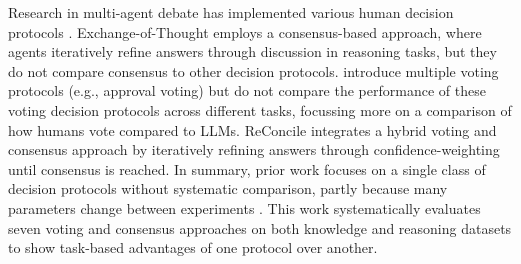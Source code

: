 Research in multi-agent debate has implemented various human decision protocols \citep{yin_exchange--thought_2023, chen_reconcile_2024, yang_llm_2024}. 
Exchange-of-Thought \citep{yin_exchange--thought_2023} employs a consensus-based approach, where agents iteratively refine answers through discussion in reasoning tasks, but they do not compare consensus to other decision protocols.
\citet{yang_llm_2024, 10.1145/3665332} introduce multiple voting protocols (e.g., approval voting) but do not compare the performance of these voting decision protocols across different tasks, focussing more on a comparison of how humans vote compared to \acp{LLM}.
ReConcile \citep{chen_reconcile_2024} integrates a hybrid voting and consensus approach by iteratively refining answers through confidence-weighting until consensus is reached. %
In summary, prior work focuses on a single class of decision protocols without systematic comparison, partly because many parameters change between experiments \citep{yin_exchange--thought_2023, yang_llm_2024, chen_reconcile_2024}.
This work systematically evaluates seven voting and consensus approaches on both knowledge and reasoning datasets to show task-based advantages of one protocol over another.

